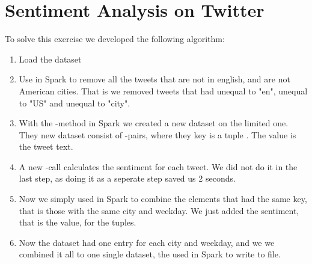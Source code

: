 \chapter{Sentiment Analysis on Twitter}

To solve this exercise we developed the following algorithm:

\begin{enumerate}
    \item Load the dataset
    
    \item Use  in Spark to remove all the tweets that are not in english, and are not American cities. That is we removed tweets that had  unequal to "en",  unequal to "US" and  unequal to "city".
    
    \item With the -method in Spark we created a new dataset on the limited one. They new dataset consist of -pairs, where they key is a tuple . The value is the tweet text. 
    
    \item A new -call calculates the sentiment for each tweet. We did not do it in the last step, as doing it as a seperate step saved us 2 seconds.
    
    \item Now we simply used  in Spark to combine the elements that had the same key, that is those with the same city and weekday. We just added the sentiment, that is the value, for the tuples.
    
    \item Now the dataset had one entry for each city and weekday, and we we combined it all to one single dataset, the used  in Spark to write to file.
\end{enumerate}